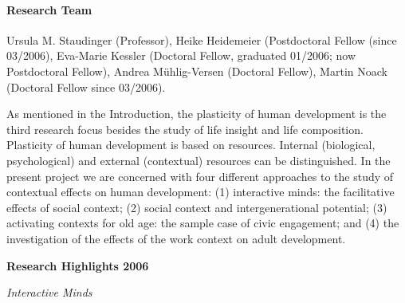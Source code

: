 

\paragraph{Research Team}
Ursula M. Staudinger (Professor), Heike Heidemeier (Postdoctoral Fellow (since 03/2006), Eva-Marie Kessler (Doctoral Fellow, graduated 01/2006; now Postdoctoral Fellow), Andrea M\"uhlig-Versen (Doctoral Fellow), Martin Noack (Doctoral Fellow since 03/2006).


As mentioned in the Introduction, the plasticity of human development is the third research focus besides the study of life insight and life composition. Plasticity of human development is based on resources. Internal (biological, psychological) and external (contextual) resources can be distinguished. In the present project we are concerned with four different approaches to the study of contextual effects on human development: (1) interactive minds: the facilitative effects of social context; (2) social context and intergenerational potential; (3) activating contexts for old age: the sample case of civic engagement; and (4) the investigation of the effects of the work context on adult development.

\null
\textbf{Research Highlights 2006}

\textit{Interactive Minds}


